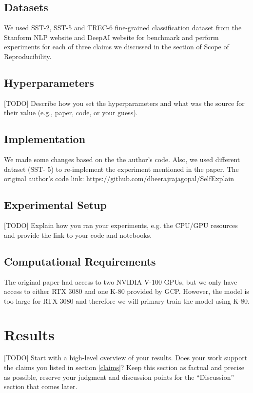 \documentclass{article}
\begin{document}
\subsection{Datasets}

We used SST-2, SST-5 and TREC-6 fine-grained classification dataset from the Stanform NLP website and DeepAI website for 
benchmark and perform experiments for each of three claims we discussed in the section of 
Scope of Reproducibility.

\subsection{Hyperparameters}

[TODO] Describe how you set the hyperparameters and what was the source for their value (e.g., paper, code, or your guess). 

\subsection{Implementation}

We made some changes based on the the author's code. Also, we used different dataset (SST- 5) to re-implement the experiment mentioned in the paper. The original author's code link: https://github.com/dheerajrajagopal/SelfExplain

\subsection{Experimental Setup}

[TODO] Explain how you ran your experiments, e.g. the CPU/GPU resources and provide the link to your code and notebooks. 

\subsection{Computational Requirements}

The original paper had access to two NVIDIA V-100 GPUs, but we only have access to either 
RTX 3080 and one K-80 provided by GCP. However, the model is too large for RTX 3080 and therefore we will 
primary train the model using K-80.

\section{Results}

[TODO] Start with a high-level overview of your results. Does your work support the claims you listed in section \ref{claims}? Keep this section as factual and precise as possible, reserve your judgment and discussion points for the ``Discussion'' section that comes later. 
\end{document}

